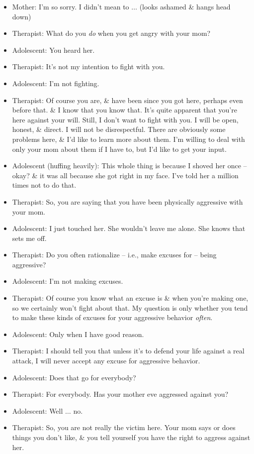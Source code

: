 \documentclass{article}
\numberwithin{equation}{section}
\begin{document}
\begin{itemize}
	\item Mother: I'm so sorry. I didn't mean to $\ldots$ (looks ashamed \& hangs head down)
	\item Therapist: What do you \textit{do} when you get angry with your mom?
	\item Adolescent: You heard her.
	\item Therapist: It's not my intention to fight with you.
	\item Adolescent: I'm not fighting.
	\item Therapist: Of course you are, \& have been since you got here, perhaps even before that. \& I know that you know that. It's quite apparent that you're here against your will. Still, I don't want to fight with you. I will be open, honest, \& direct. I will not be disrespectful. There are obviously some problems here, \& I'd like to learn more about them. I'm willing to deal with only your mom about them if I have to, but I'd like to get your input.
	\item Adolescent (huffing heavily): This whole thing is because I shoved her once -- okay? \& it was all because she got right in my face. I've told her a million times not to do that.
	\item Therapist: So, you are saying that you have been physically aggressive with your mom.
	\item Adolescent: I just touched her. She wouldn't leave me alone. She knows that sets me off.
	\item Therapist: Do you often rationalize -- i.e., make excuses for -- being aggressive?
	\item Adolescent: I'm not making excuses.
	\item Therapist: Of course you know what an excuse is \& when you're making one, so we certainly won't fight about that. My question is only whether you tend to make these kinds of excuses for your aggressive behavior \textit{often}.
	\item Adolescent: Only when I have good reason.
	\item Therapist: I should tell you that unless it's to defend your life against a real attack, I will never accept any excuse for aggressive behavior.
	\item Adolescent: Does that go for everybody?
	\item Therapist: For everybody. Has your mother eve aggressed against you?
	\item Adolescent: Well $\ldots$ no.
	\item Therapist: So, you are not really the victim here. Your mom says or does things you don't like, \& you tell yourself you have the right to aggress against her.

\end{itemize}
\end{document}
